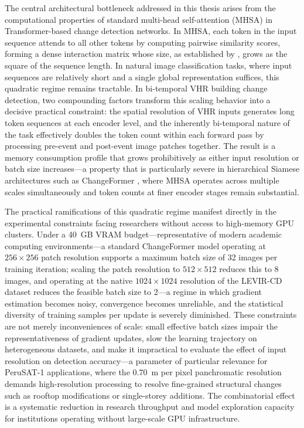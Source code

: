 The central architectural bottleneck addressed in this thesis arises from the
computational properties of standard multi-head self-attention (MHSA) in
Transformer-based change detection networks. In MHSA, each token in the input
sequence attends to all other tokens by computing pairwise similarity scores,
forming a dense interaction matrix whose size, as established by
\cite{Vaswani2017Attention}, grows as the square of the sequence length.
In natural image classification tasks, where
input sequences are relatively short and a single global representation suffices,
this quadratic regime remains tractable. In bi-temporal VHR building change
detection, two compounding factors transform this scaling behavior into a decisive
practical constraint: the spatial resolution of VHR inputs generates long token
sequences at each encoder level, and the inherently bi-temporal nature of the
task effectively doubles the token count within each forward pass by processing
pre-event and post-event image patches together. The result is a memory
consumption profile that grows prohibitively as either input resolution or batch
size increases---a property that is particularly severe in hierarchical Siamese
architectures such as ChangeFormer \cite{Bandara2022ChangeFormer}, where MHSA
operates across multiple scales simultaneously and token counts at finer encoder
stages remain substantial.

The practical ramifications of this quadratic regime manifest directly in the
experimental constraints facing researchers without access to high-memory GPU
clusters. Under a 40~GB VRAM budget---representative of modern academic computing
environments---a standard ChangeFormer model operating at $256 \times 256$ patch
resolution supports a maximum batch size of 32 images per training iteration;
scaling the patch resolution to $512 \times 512$ reduces this to 8 images, and
operating at the native $1024 \times 1024$ resolution of the LEVIR-CD dataset
reduces the feasible batch size to 2---a regime in which gradient estimation
becomes noisy, convergence becomes unreliable, and the statistical diversity of
training samples per update is severely diminished. These constraints are not
merely inconveniences of scale: small effective batch sizes impair the
representativeness of gradient updates, slow the learning trajectory on
heterogeneous datasets, and make it impractical to evaluate the effect of input
resolution on detection accuracy---a parameter of particular relevance for
PeruSAT-1 applications, where the 0.70~m per pixel panchromatic resolution
demands high-resolution processing to resolve fine-grained structural changes
such as rooftop modifications or single-storey additions. The combinatorial
effect is a systematic reduction in research throughput and model exploration
capacity for institutions operating without large-scale GPU infrastructure.

